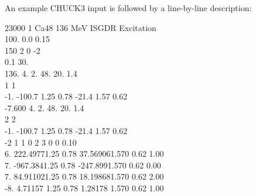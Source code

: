 \documentclass[a4paper,10pt]{article}
\begin{document}
An example CHUCK3 input is followed by a line-by-line description:

     23000     1    Ca48  136 MeV      ISGDR Excitation\\
100.    0.0    0.15\\
150  2  0 -2\\
0.1     30.\\
136.    4.      2.      48.     20.     1.4\\
  1  1\\
-1.     -100.7  1.25    0.78            -21.4   1.57    0.62 \\
-7.600  4.      2.      48.     20.     1.4\\
  2  2\\
-1.     -100.7  1.25    0.78            -21.4   1.57    0.62 \\
 -2  1  1  0  2  3  0  0 0.10\\
6.      222.49771.25    0.78            37.569061.570   0.62            1.00\\
7.      -967.3841.25    0.78            -247.8991.570   0.62            0.00\\
7.      84.911021.25    0.78            18.198681.570   0.62            2.00\\
-8.     4.71157 1.25    0.78            1.28178 1.570   0.62            1.00\\
\end{document}
